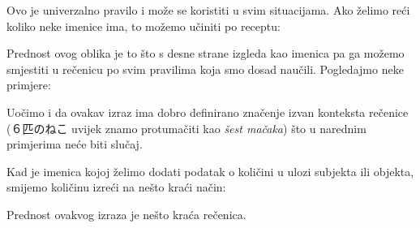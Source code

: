	
	Ovo je univerzalno pravilo i može se koristiti u svim situacijama. Ako želimo reći koliko neke imenice ima, to možemo učiniti po receptu:
	
	
	Prednost ovog oblika je to što s desne strane izgleda kao imenica pa ga možemo smjestiti u rečenicu po svim pravilima koja smo dosad naučili. Pogledajmo neke primjere:
	
	\begin{reibun}
	\end{reibun}

	Uočimo i da ovakav izraz ima dobro definirano značenje izvan konteksta rečenice (６匹のねこ uvijek znamo protumačiti kao \textit{šest mačaka}) što u narednim primjerima neće biti slučaj.
	
	\newpage
	
	Kad je imenica kojoj želimo dodati podatak o količini u ulozi subjekta ili objekta, smijemo količinu izreći na nešto kraći način:
	
	
	
	Prednost ovakvog izraza je nešto kraća rečenica.
	
	
